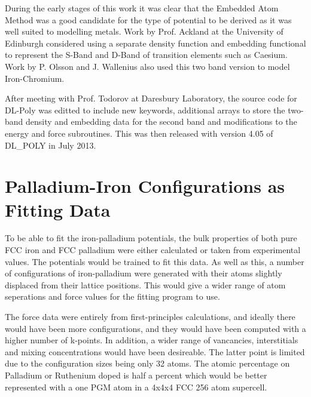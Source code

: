 During the early stages of this work it was clear that the Embedded Atom Method was a good candidate for the type of potential to be derived as it was well suited to modelling metals.  Work by Prof. Ackland at the University of Edinburgh considered using a separate density function and embedding functional to represent the S-Band and D-Band of transition elements such as Caesium.  Work by P. Olsson and J. Wallenius also used this two band version to model Iron-Chromium.  

After meeting with Prof. Todorov at Daresbury Laboratory, the source code for DL-Poly was editted to include new keywords, additional arrays to store the two-band density and embedding data for the second band and modifications to the energy and force subroutines.  This was then released with version 4.05 of DL_POLY in July 2013.  






\section{Palladium-Iron Configurations as Fitting Data}

To be able to fit the iron-palladium potentials, the bulk properties of both pure FCC iron and FCC palladium were either calculated or taken from experimental values.  The potentials would be trained to fit this data.  As well as this, a number of configurations of iron-palladium were generated with their atoms slightly displaced from their lattice positions.  This would give a wider range of atom seperations and force values for the fitting program to use.

The force data were entirely from first-principles calculations, and ideally there would have been more configurations, and they would have been computed with a higher number of k-points.  In addition, a wider range of vancancies, interstitials and mixing concentrations would have been desireable.  The latter point is limited due to the configuration sizes being only 32 atoms.  The atomic percentage on Palladium or Ruthenium doped is half a percent which would be better represented with a one PGM atom in a 4x4x4 FCC 256 atom supercell.














